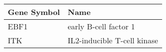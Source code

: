 \begin{tabular}{ll}
\toprule
Gene Symbol &                        Name \\
\midrule
       EBF1 &       early B-cell factor 1 \\
        ITK & IL2-inducible T-cell kinase \\
\bottomrule
\end{tabular}
